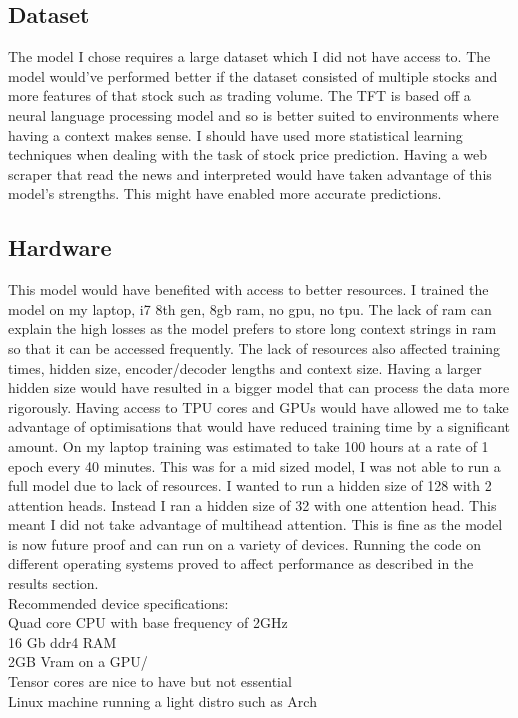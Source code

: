 \documentclass{article}
\begin{document}
\subsection{Dataset}
The model I chose requires a large dataset which I did not have access to. The model
would've performed better if the dataset consisted of multiple stocks and more
features of that stock such as trading volume. The TFT is based off a neural
language processing model and so is better suited to environments where having a
context makes sense. I should have used more statistical learning techniques when
dealing with the task of stock price prediction. Having a web scraper that read
the news and interpreted would have taken advantage of this model's strengths. This
might have enabled more accurate predictions.

\subsection{Hardware}
This model would have benefited with access to better resources. I trained the model
on my laptop, i7 8th gen, 8gb ram, no gpu, no tpu. The lack of ram can explain the
high losses as the model prefers to store long context strings in ram so that it can
be accessed frequently. The lack of resources also affected training times, hidden
size, encoder/decoder lengths and context size. Having a larger hidden size would
have resulted in a bigger model that can process the data more rigorously. Having
access to TPU cores and GPUs would have allowed me to take advantage of optimisations
that would have reduced training time by a significant amount. On my laptop training
was estimated to take 100 hours at a rate of 1 epoch every 40 minutes. This was for
a mid sized model, I was not able to run a full model due to lack of resources. I
wanted to run a hidden size of 128 with 2 attention heads. Instead I ran a hidden
size of 32 with one attention head. This meant I did not take advantage of
multihead attention. This is fine as the model is now future proof and can run on
a variety of devices. Running the code on different operating systems proved to
affect performance as described in the results section.
\\Recommended device specifications:\\
Quad core CPU with base frequency of 2GHz\\
16 Gb ddr4 RAM\\
2GB Vram on a GPU/\\
Tensor cores are nice to have but not essential\\
Linux machine running a light distro such as Arch
\end{document}
